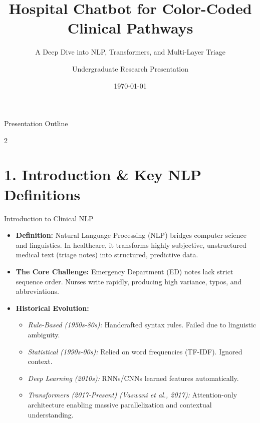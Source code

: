 \documentclass[aspectratio=169]{beamer}
\title[Clinical NLP \& BioBERT]{Hospital Chatbot for Color-Coded Clinical Pathways}
\subtitle{A Deep Dive into NLP, Transformers, and Multi-Layer Triage}
\author{Undergraduate Research Presentation}
\date{\today}
\begin{document}
	
	\begin{frame}
		\titlepage
	\end{frame}
	
\begin{frame}{Presentation Outline}
	\begin{multicols}{2}
		\tableofcontents[hideallsubsections]
	\end{multicols}
\end{frame}
	
	\section{1. Introduction \& Key NLP Definitions}
	
	\begin{frame}{Introduction to Clinical NLP}
		\begin{itemize}
			\item \textbf{Definition:} Natural Language Processing (NLP) bridges computer science and linguistics. In healthcare, it transforms highly subjective, unstructured medical text (triage notes) into structured, predictive data.
			\item \textbf{The Core Challenge:} Emergency Department (ED) notes lack strict sequence order. Nurses write rapidly, producing high variance, typos, and abbreviations.
			\item \textbf{Historical Evolution:}
			\begin{itemize}
				\item \textit{Rule-Based (1950s-80s):} Handcrafted syntax rules. Failed due to linguistic ambiguity.
				\item \textit{Statistical (1990s-00s):} Relied on word frequencies (TF-IDF). Ignored context.
				\item \textit{Deep Learning (2010s):} RNNs/CNNs learned features automatically.
				\item \textit{Transformers (2017-Present) (Vaswani et al., 2017):} Attention-only architecture enabling massive parallelization and contextual understanding.
			\end{itemize}
		\end{itemize}
	\end{frame}
	
\end{document}

